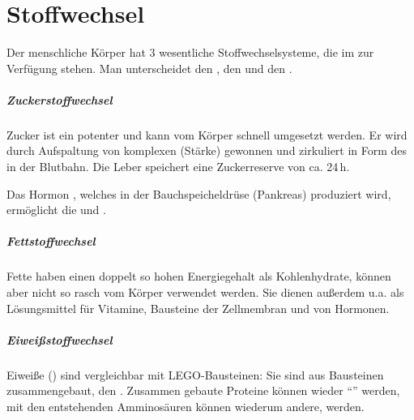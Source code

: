 \section{Stoffwechsel}
\label{topic:stoffwechsel}



{
Der menschliche Körper hat 3 wesentliche Stoffwechselsysteme, die im zur
Verfügung stehen. Man unterscheidet den , den  und den
.

\subparagraph{Zuckerstoffwechsel} Zucker ist ein potenter 
und kann vom Körper schnell umgesetzt werden. Er wird durch Aufspaltung von
komplexen  (Stärke) gewonnen und zirkuliert in Form des
 in der Blutbahn. Die Leber speichert eine Zuckerreserve von ca.
24\,h.

Das Hormon \label{topic:insulin}, welches in der Bauchspeicheldrüse
(Pankreas) produziert wird,  ermöglicht die  und . 

\subparagraph{Fettstoffwechsel} Fette haben einen doppelt so hohen Energiegehalt
als Kohlenhydrate, können aber nicht so rasch vom Körper verwendet werden.
Sie dienen außerdem u.a. als Lösungsmittel für Vitamine, Bausteine der
Zellmembran und von Hormonen. 

\subparagraph{Eiweißstoffwechsel} Eiweiße () sind vergleichbar mit
LEGO\texttrademark{}-Bausteinen: Sie sind aus Bausteinen zusammengebaut, den
. Zusammen gebaute Proteine können wieder "`"'
werden, mit den entstehenden Amminosäuren können wiederum andere,  werden. 

}
